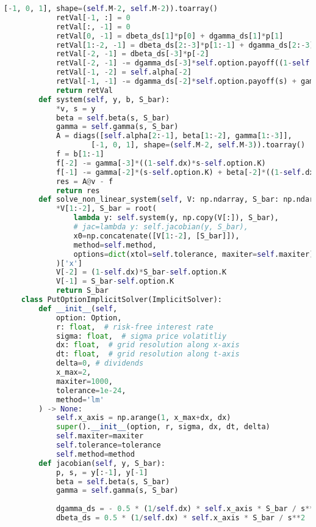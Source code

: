 \begin{lstlisting}[language=Python, caption=Implicit solver for Nielsen transformation]
                        [-1, 0, 1], shape=(self.M-2, self.M-2)).toarray()
            retVal[-1, :] = 0
            retVal[:, -1] = 0
            retVal[0, -1] = dbeta_ds[1]*p[0] + dgamma_ds[1]*p[1]
            retVal[1:-2, -1] = dbeta_ds[2:-3]*p[1:-1] + dgamma_ds[2:-3]*p[2:]
            retVal[-2, -1] = dbeta_ds[-3]*p[-2]
            retVal[-2, -1] -= dgamma_ds[-3]*self.option.payoff((1-self.dx)*s) + gamma[-3]*(1 - self.dx)
            retVal[-1, -2] = self.alpha[-2]
            retVal[-1, -1] -= dgamma_ds[-2]*self.option.payoff(s) + gamma[-2] + dbeta_ds[-2]*self.option.payoff((1-self.dx)*s) - beta[1]*(1-self.dx)
            return retVal
        def system(self, y, b, S_bar):
            *v, s = y
            beta = self.beta(s, S_bar)
            gamma = self.gamma(s, S_bar)
            A = diags([self.alpha[2:-1], beta[1:-2], gamma[1:-3]],
                    [-1, 0, 1], shape=(self.M-2, self.M-3)).toarray()
            f = b[1:-1]
            f[-2] -= gamma[-3]*((1-self.dx)*s-self.option.K)
            f[-1] -= gamma[-2]*(s-self.option.K) + beta[-2]*((1-self.dx)*s - self.option.K)
            res = A@v - f
            return res
        def solve_non_linear_system(self, V: np.ndarray, S_bar: np.ndarray):
            *V[1:-2], S_bar = root(
                lambda y: self.system(y, np.copy(V[:]), S_bar),
                # jac=lambda y: self.jacobian(y, S_bar),
                x0=np.concatenate([V[1:-2], [S_bar]]),
                method=self.method,
                options=dict(xtol=self.tolerance, maxiter=self.maxiter)
            )['x']
            V[-2] = (1-self.dx)*S_bar-self.option.K
            V[-1] = S_bar-self.option.K
            return S_bar
    class PutOptionImplicitSolver(ImplicitSolver):
        def __init__(self, 
            option: Option,
            r: float,  # risk-free interest rate
            sigma: float,  # sigma price volatitliy
            dx: float,  # grid resolution along x-axis
            dt: float,  # grid resolution along t-axis
            delta=0, # dividends
            x_max=2,
            maxiter=1000,
            tolerance=1e-24,
            method='lm'
        ) -> None:
            self.x_axis = np.arange(1, x_max+dx, dx)
            super().__init__(option, r, sigma, dx, dt, delta)
            self.maxiter=maxiter
            self.tolerance=tolerance
            self.method=method
        def jacobian(self, y, S_bar):
            p, s, = y[:-1], y[-1]
            beta = self.beta(s, S_bar)
            gamma = self.gamma(s, S_bar)
    
            dgamma_ds = - 0.5 * (1/self.dx) * self.x_axis * S_bar / s**2
            dbeta_ds = 0.5 * (1/self.dx) * self.x_axis * S_bar / s**2
    

\end{lstlisting}
